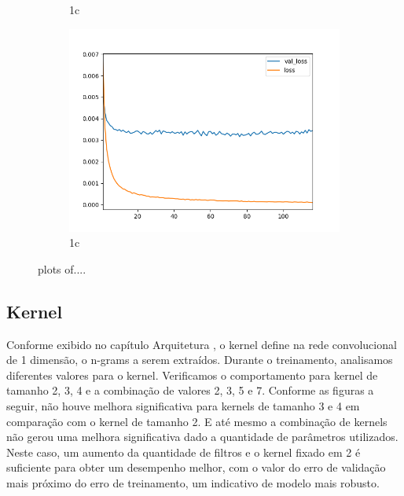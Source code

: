 \begin{figure}
\begin{subfigure}{.5\textwidth}
  \caption{1c}
  \label{fig:sfig3}
\end{subfigure}
\begin{subfigure}{.5\textwidth}
  \centering
  \includegraphics[width=.8\linewidth]{figuras/ape-ajustes-hiper-parametros/training-cnn-1000-k-2.png}
  \caption{1c}
  \label{fig:sfig4}
\end{subfigure}
\caption{plots of....}
\label{fig:fig}
\end{figure}



\subsection{Kernel}

Conforme exibido no capítulo Arquitetura , o kernel define na rede convolucional de 1 dimensão, o n-grams a serem extraídos. Durante o treinamento, analisamos diferentes valores para o kernel. Verificamos o comportamento para kernel de tamanho 2, 3, 4 e a combinação de valores 2, 3, 5 e 7. Conforme as figuras a seguir, não houve melhora significativa para kernels de tamanho 3 e 4 em comparação com o kernel de tamanho 2. E até mesmo a combinação de kernels não gerou uma melhora significativa dado a quantidade de parâmetros utilizados. Neste caso, um aumento da quantidade de filtros e o kernel fixado em 2 é suficiente para obter um desempenho melhor, com o valor do erro de validação mais próximo do erro de treinamento, um indicativo de modelo mais robusto.





